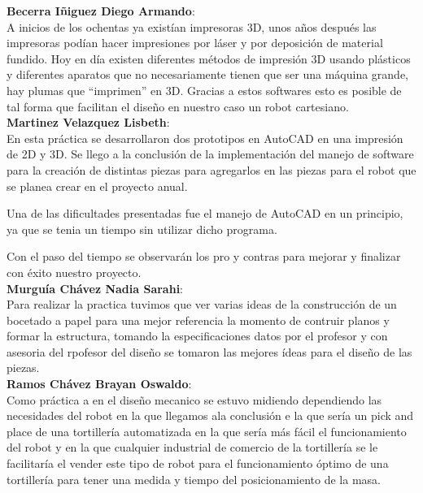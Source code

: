 \documentclass[12pt,a4paper]{report}
\begin{document}
\textbf{Becerra I\~niguez Diego Armando}:\\
A inicios de los ochentas ya exist\'ian impresoras 3D, unos años despu\'es las impresoras pod\'ian hacer impresiones por láser y por deposición de material fundido. Hoy en día existen diferentes métodos de impresi\'on 3D usando pl\'asticos y diferentes aparatos que no necesariamente tienen que ser una m\'aquina grande, hay plumas que “imprimen” en 3D. Gracias a estos softwares esto es posible de tal forma que facilitan el diseño en nuestro caso un robot cartesiano.\\

\textbf{Martinez Velazquez Lisbeth}:\\
En esta pr\'actica se desarrollaron dos prototipos en AutoCAD en una impresión de 2D y 3D. Se llego a la conclusi\'on de la implementación del manejo de software para la creaci\'on de distintas piezas para agregarlos en las piezas para el robot que se planea crear en el proyecto anual.
 
Una de las dificultades presentadas fue el manejo de AutoCAD en un principio, ya que se tenia un tiempo sin utilizar dicho programa.

Con el paso del tiempo se observar\'an los pro y contras para mejorar y finalizar con \'exito nuestro proyecto.\\

\textbf{Murgu\'ia Ch\'avez Nadia Sarahi}:\\
Para realizar la practica tuvimos que ver varias ideas de la construcci\'on de un bocetado a papel para una mejor referencia la momento de contruir planos y formar la estructura, tomando la especificaciones datos por el profesor y con asesoria del rpofesor del diseño se tomaron las mejores \'ideas para el diseño de las piezas.\\

\textbf{Ramos Ch\'avez Brayan Oswaldo}:\\
Como pr\'actica a en el dise\~no mecanico se estuvo midiendo dependiendo las necesidades del robot en la que llegamos ala conclusi\'on e  la que ser\'ia un pick and place de una tortiller\'ia automatizada en la que ser\'ia m\'as f\'acil el funcionamiento del robot y en la que cualquier industrial de comercio de la tortiller\'ia se le facilitar\'ia el vender este tipo de robot para el funcionamiento \'optimo de una tortiller\'ia para tener una medida y tiempo del posicionamiento de la masa.\\
\end{document}

